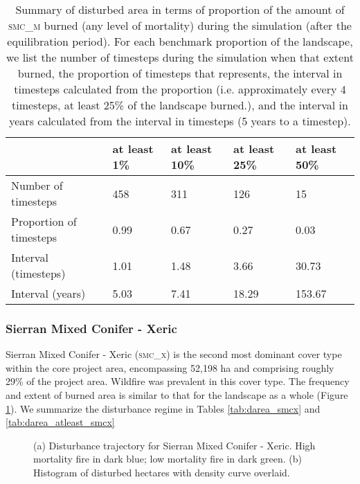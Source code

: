 \begin{table}[!htbp]
\centering
\caption{Summary of disturbed area in terms of proportion of the amount of \textsc{smc\_m} burned (any level of mortality) during the simulation (after the equilibration period). For each benchmark proportion of the landscape, we list the number of timesteps during the simulation when that extent burned, the proportion of timesteps that represents, the interval in timesteps calculated from the proportion (i.e. approximately every 4 timesteps, at least 25\% of the landscape burned.), and the interval in years calculated from the interval in timesteps (5 years to a timestep).}
\label{tab:darea_atleast_smcm}
\begin{tabular}{@{}lllll@{}}
                        & at least 1\% & at least 10\% & at least 25\% & at least 50\% \\ \midrule
Number of timesteps     & 458          & 311           & 126           & 15            \\
Proportion of timesteps & 0.99         & 0.67          & 0.27          & 0.03          \\
Interval (timesteps)    & 1.01         & 1.48          & 3.66          & 30.73         \\
Interval (years)        & 5.03         & 7.41          & 18.29         & 153.67       \\ \bottomrule
\end{tabular}
\end{table}

\clearpage


\subsubsection{Sierran Mixed Conifer - Xeric}
Sierran Mixed Conifer - Xeric (\textsc{smc\_x}) is the second most dominant cover type within the core project area, encompassing 52,198 ha and comprising roughly 29\% of the project area. Wildfire was prevalent in this cover type. The frequency and extent of burned area is similar to that for the landscape as a whole (Figure \ref{fig:darea_smcx}). We summarize the disturbance regime in Tables \ref{tab:darea_smcx} and \ref{tab:darea_atleast_smcx}

\begin{figure}[!htbp]
  \centering
  \caption{\small (a) Disturbance trajectory for Sierran Mixed Conifer - Xeric. High mortality fire in dark blue; low mortality fire in dark green. (b) Histogram of disturbed hectares with density curve overlaid.} 
  \label{fig:darea_smcx}
\end{figure}

